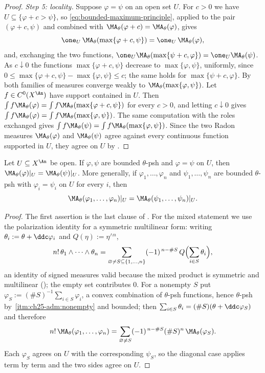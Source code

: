 \begin{proof}
\emph{Step 5: locality.}  Suppose \(\varphi=\psi\) on an open set \(U\).  For
\(c>0\) we have \(U\subseteq\{\varphi+c>\psi\}\), so
\eqref{eq:bounded-maximum-principle}, applied to the pair
\((\varphi+c,\psi)\) and combined with
\(\MA_\theta(\varphi+c)=\MA_\theta(\varphi)\), gives
\[
 \one_{U}\,\MA_\theta(\max\{\varphi+c,\psi\})
 =\one_{U}\,\MA_\theta(\varphi) ,
\]
and, exchanging the two functions,
\(\one_U\MA_\theta(\max\{\psi+c,\varphi\})=\one_U\MA_\theta(\psi)\).  As
\(c\downarrow0\) the functions \(\max\{\varphi+c,\psi\}\) decrease to
\(\max\{\varphi,\psi\}\), uniformly, since
\(0\leq\max\{\varphi+c,\psi\}-\max\{\varphi,\psi\}\leq c\); the same holds
for \(\max\{\psi+c,\varphi\}\).  By  both
families of measures converge weakly to
\(\MA_\theta(\max\{\varphi,\psi\})\).  Let \(f\in C^0(X^{\An})\) have support
contained in \(U\).  Then \(\int f\MA_\theta(\varphi)
=\int f\MA_\theta(\max\{\varphi+c,\psi\})\) for every \(c>0\), and letting
\(c\downarrow0\) gives \(\int f\MA_\theta(\varphi)
=\int f\MA_\theta(\max\{\varphi,\psi\})\).  The same computation with the
roles exchanged gives \(\int f\MA_\theta(\psi)
=\int f\MA_\theta(\max\{\varphi,\psi\})\).  Since the two Radon measures
\(\MA_\theta(\varphi)\) and \(\MA_\theta(\psi)\) agree against every
continuous function supported in \(U\), they agree on \(U\) by
.
\end{proof}

\begin{corollary}
\label{cor:ch25-locality}
Let \(U\subseteq X^{\An}\) be open.  If \(\varphi,\psi\) are bounded
\(\theta\)-psh and \(\varphi=\psi\) on \(U\), then
\(\MA_\theta(\varphi)|_U=\MA_\theta(\psi)|_U\).  More generally, if
\(\varphi_1,\ldots,\varphi_n\) and \(\psi_1,\ldots,\psi_n\) are bounded
\(\theta\)-psh with \(\varphi_i=\psi_i\) on \(U\) for every \(i\), then
\[
 \MA_\theta(\varphi_1,\ldots,\varphi_n)|_U
 =\MA_\theta(\psi_1,\ldots,\psi_n)|_U .
\]
\end{corollary}

\begin{proof}
The first assertion is the last clause of
.  For the mixed statement we use the
polarization identity for a symmetric multilinear form: writing
\(\theta_i:=\theta+\ddc\varphi_i\) and \(Q(\eta):=\eta^{\wedge n}\),
\[
 n!\,\theta_1\wedge\cdots\wedge\theta_n
 =\sum_{\varnothing\neq S\subseteq\{1,\ldots,n\}}(-1)^{\,n-\#S}\,
   Q\Bigl(\sum_{i\in S}\theta_i\Bigr),
\]
an identity of signed measures valid because the mixed product is symmetric
and multilinear (); the empty set
contributes \(0\).  For a nonempty \(S\) put
\(\varphi_S:=(\#S)^{-1}\sum_{i\in S}\varphi_i\), a convex combination of
\(\theta\)-psh functions, hence \(\theta\)-psh by
\,\cref{itm:ch25-adm:nonempty} and bounded;
then \(\sum_{i\in S}\theta_i=(\#S)(\theta+\ddc\varphi_S)\) and therefore
\[
 n!\,\MA_\theta(\varphi_1,\ldots,\varphi_n)
 =\sum_{\varnothing\neq S}(-1)^{\,n-\#S}(\#S)^n\,
    \MA_\theta(\varphi_S).
\]
Each \(\varphi_S\) agrees on \(U\) with the corresponding \(\psi_S\), so the
diagonal case applies term by term and the two sides agree on \(U\).
\end{proof}

